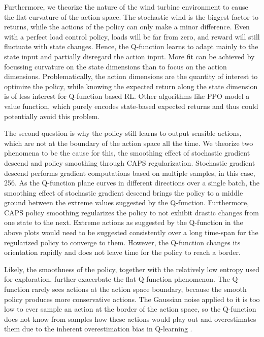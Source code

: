 Furthermore, we theorize the nature of the wind turbine environment to cause the flat curvature of the action space. The stochastic wind is the biggest factor to returns, while the actions of the policy can only make a minor difference. Even with a perfect load control policy, loads will be far from zero, and reward will still fluctuate with state changes. Hence, the Q-function learns to adapt mainly to the state input and partially disregard the action input. More fit can be achieved by focussing curvature on the state dimensions than to focus on the action dimensions. Problematically, the action dimensions are the quantity of interest to optimize the policy, while knowing the expected return along the state dimension is of less interest for Q-function based RL. Other algorithms like \ac{PPO} \cite{schulmanProximalPolicyOptimization2017} model a value function, which purely encodes state-based expected returns and thus could potentially avoid this problem.

The second question is why the policy still learns to output sensible actions, which are not at the boundary of the action space all the time. We theorize two phenomena to be the cause for this, the smoothing effect of stochastic gradient descend and policy smoothing through CAPS regularization. Stochastic gradient descend performs gradient computations based on multiple samples, in this case, 256. As the Q-function plane curves in different directions over a single batch, the smoothing effect of stochastic gradient descend brings the policy to a middle ground between the extreme values suggested by the Q-function. Furthermore, CAPS policy smoothing regularizes the policy to not exhibit drastic changes from one state to the next. Extreme actions as suggested by the Q-function in the above plots would need to be suggested consistently over a long time-span for the regularized policy to converge to them. However, the Q-function changes its orientation rapidly and does not leave time for the policy to reach a border.

Likely, the smoothness of the policy, together with the relatively low entropy used for exploration, further exacerbate the flat Q-function phenomenon. The Q-function rarely sees actions at the action space boundary, because the smooth policy produces more conservative actions. The Gaussian noise applied to it is too low to ever sample an action at the border of the action space, so the Q-function does not know from samples how these actions would play out and overestimates them due to the inherent overestimation bias in Q-learning \cite{fujimotoAddressingFunctionApproximation2018}.

